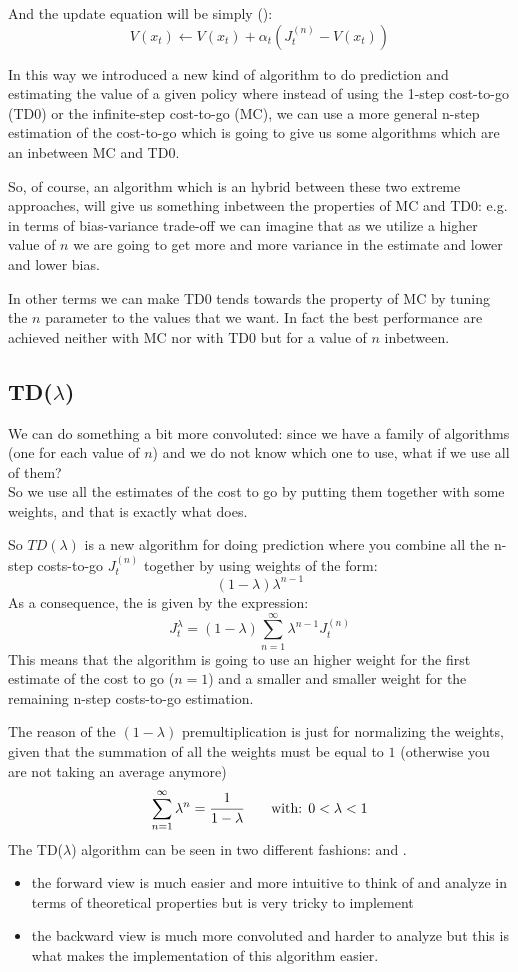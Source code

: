And the update equation will be simply ():
\[V(x_t) \leftarrow V(x_t) + \alpha_t (J_t^{(n)} - V(x_t))\]

In this way we introduced a new kind of algorithm to do prediction and estimating the value of a given policy where instead of using the 1-step cost-to-go (TD0) or the infinite-step cost-to-go (MC), we can use a more general n-step estimation of the cost-to-go which is going to give us some algorithms which are an inbetween MC and TD0.

So, of course, an algorithm which is an hybrid between these two extreme approaches, will give us something inbetween the properties of MC and TD0: e.g. in terms of bias-variance trade-off we can imagine that as we utilize a higher value of $n$ we are going to get more and more variance in the estimate and lower and lower bias.

In other terms we can make TD0 tends towards the property of MC by tuning the $n$ parameter to the values that we want.
In fact the best performance are achieved neither with MC nor with TD0 but for a value of $n$ inbetween.

\subsection{TD($\lambda$)}
We can do something a bit more convoluted: since we have a family of algorithms (one for each value of $n$) and we do not know which one to use, what if we use all of them?\\
So we use all the estimates of the cost to go by putting them together with some weights, and that is exactly what  does.

So $TD(\lambda)$ is a new algorithm for doing prediction where you combine all the n-step costs-to-go $J_t^{(n)}$ together by using weights of the form:
\[(1-\lambda)\lambda^{n-1}\]
As a consequence, the  is given by the expression:
\[J_t^{\lambda} = (1-\lambda) \sum_{n=1}^{\infty} \lambda^{n-1} J_t^{(n)}\]
This means that the algorithm is going to use an higher weight for the first estimate of the cost to go ($n=1$) and a smaller and smaller weight for the remaining n-step costs-to-go estimation.

The reason of the $(1-\lambda)$ premultiplication is just for normalizing the weights, given that the summation of all the weights must be equal to $1$ (otherwise you are not taking an average anymore)
\[\sum_{n=1}^{\infty}\lambda^n = \cfrac{1}{1-\lambda}\qquad \text{with: }0<\lambda<1\]
The TD($\lambda$) algorithm can be seen in two different fashions:  and .
\begin{itemize}
\item the forward view is much easier and more intuitive to think of and analyze in terms of theoretical properties but is very tricky to implement
\item the backward view is much more convoluted and harder to analyze but this is what makes the implementation of this algorithm easier.
\end{itemize}

